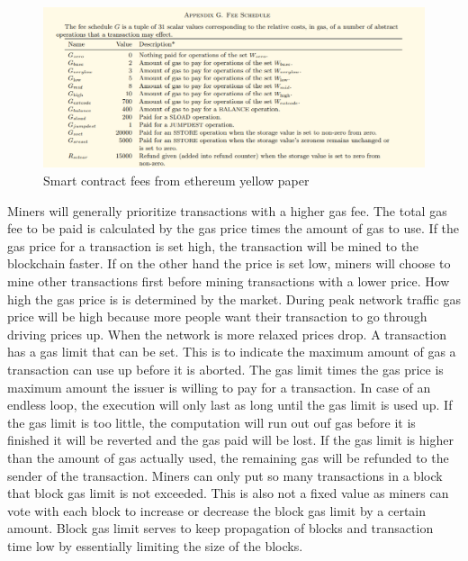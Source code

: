 \begin{figure}[ht!]
  \begin{center}
  \includegraphics[scale=0.6]{Talk7/img/smart_contracts/gas-fees}
 	\end{center}
  \caption{Smart contract fees from ethereum yellow paper}
 	\label{smart_contract_fees}
\end{figure}

Miners will generally prioritize transactions with a higher gas fee. The total gas fee to be paid is calculated by the gas price times the amount of gas to use. If the gas price for a transaction is set high, the transaction will be mined to the blockchain faster. If on the other hand the price is set low, miners will choose to mine other transactions first
before mining transactions with a lower price. How high the gas price is is determined by the market. During peak network traffic gas price will be high because more people want their transaction to go through driving prices up. When the network is more relaxed prices drop.
A transaction has a gas limit that can be set. This is to indicate the maximum amount of gas a transaction can use up before it is aborted. The gas limit times the gas price is maximum amount the issuer is willing to pay for a transaction. In case of an endless loop, the execution will only last as long until the gas limit is used up.
If the gas limit is too little, the computation will run out ouf gas before it is finished it will be reverted and the gas paid will be lost. If the gas limit is higher than the amount of gas actually used, the remaining gas will be refunded to the sender of the transaction. 
Miners can only put so many transactions in a block that block gas limit is not exceeded. This is also not a fixed value as miners can vote with each block to increase or decrease the block gas limit by a certain amount. Block gas limit serves to keep propagation of blocks and transaction time low by essentially limiting the size of the blocks.

